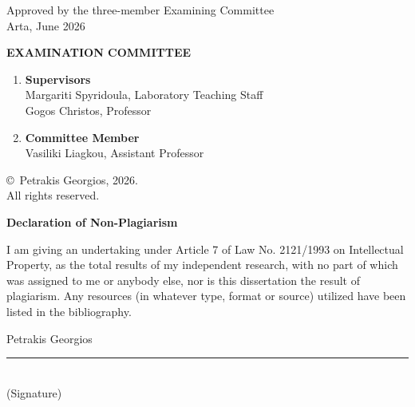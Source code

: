 \thispagestyle{empty}
\vspace*{2cm}
\begin{center}
    Approved by the three-member Examining Committee \\
    Arta, June 2026
\end{center}

\vspace{3cm}

\textbf{EXAMINATION COMMITTEE}

\begin{enumerate}
    \item \textbf{Supervisors} \\
    Margariti Spyridoula, Laboratory Teaching Staff \\
    Gogos Christos, Professor

    \item \textbf{Committee Member} \\
    Vasiliki Liagkou, Assistant Professor
\end{enumerate}

\vfill

\begin{center}
    \copyright\ Petrakis Georgios, 2026. \\
    All rights reserved.
\end{center}

\clearpage
\thispagestyle{empty}
\vspace*{2cm}

\begin{center}
    \textbf{\Large Declaration of Non-Plagiarism}
\end{center}

\vspace{1cm}

\noindent
I am giving an undertaking under Article 7 of Law No. 2121/1993 on Intellectual Property, as the total results of my independent research, with no part of which was assigned to me or anybody else, nor is this dissertation the result of plagiarism. Any resources (in whatever type, format or source) utilized have been listed in the bibliography.

\vspace{3cm}

\noindent
Petrakis Georgios

\vspace{1.5cm}

\noindent
\rule{5cm}{0.4pt} \\
(Signature)

\clearpage
